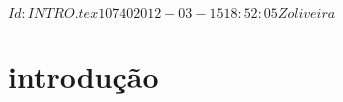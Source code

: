 \SVN $Id: INTRO.tex 10740 2012-03-15 18:52:05Z oliveira $
\chapter[Introdução, por Autor]{introdução}



